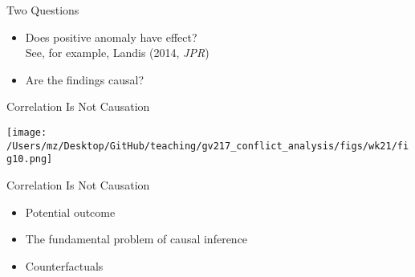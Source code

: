 \documentclass{beamer}
\begin{document}
\begin{frame}{Two Questions}
    \begin{itemize}
        \pause\item Does positive anomaly have effect?\\
        \pause      See, for example, Landis (2014, \emph{JPR})
        \pause\item Are the findings causal?
    \end{itemize}
\end{frame}

\begin{frame}{Correlation Is Not Causation}
    \pause
    \begin{center}
        \texttt{[image: /Users/mz/Desktop/GitHub/teaching/gv217\_conflict\_analysis/figs/wk21/fig10.png]}
    \end{center}
\end{frame}

\begin{frame}{Correlation Is Not Causation}
    \begin{itemize}
        \pause\item Potential outcome
        \pause\item The fundamental problem of causal inference
        \pause\item Counterfactuals
    \end{itemize}
\end{frame}
\end{document}
